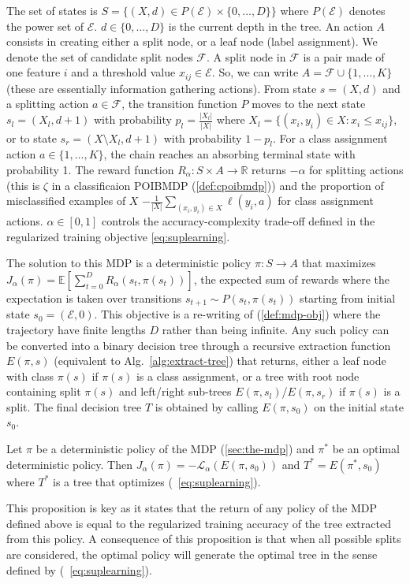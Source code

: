 The set of states is $S = \{ (X, d) \in P(\mathcal{E}) \times \{0, \ldots, D\} \}$ where $P(\mathcal{E})$ denotes the power set of $\mathcal{E}$. $d \in \{0,\ldots,D\}$ is the current depth in the tree.
An action $A$ consists in creating either a split node, or a leaf node (label assignment). We denote the set of candidate split nodes $ {\mathcal F} $. A split node in $\mathcal F$ is a pair made of one feature $i$ and a threshold value $x_{ij}\in \mathcal{E}$.
So, we can write $A = {\mathcal{F} \cup \{ 1, \ldots, K \}}$ (these are essentially information gathering actions).
From state $s=(X,d)$ and a splitting action $a \in {\mathcal F}$, the transition function $P$ moves to the next state $s_l = (X_l, d+1)$ with probability $p_l = \frac{|X_l|}{|X|}$ where $X_l = \{(x_i, y_i) \in X: x_i \leq x_{ij}\}$, or to state $s_r = (X \setminus X_l, d+1)$ with probability $1-p_l$. For a class assignment action $a \in \{1,\ldots,K\}$, the chain reaches an absorbing terminal state with probability 1. 
The reward function $R_{\alpha}: S \times A \rightarrow \mathbb{R}$ returns $-\alpha$ for splitting actions (this is $\zeta$ in a classificaion POIBMDP (\ref{def:cpoibmdp})) and the proportion of misclassified examples of $X$ $-\frac{1}{|X|}\sum_{(x_i,y_i) \in X} \ell(y_i, a)$ for class assignment actions. $\alpha \in [0,1]$ controls the accuracy-complexity trade-off defined in the regularized training objective \ref{eq:suplearning}. 

The solution to this MDP is a deterministic policy $\pi: S \rightarrow A$ that maximizes {$J_{\alpha}(\pi) ={\mathbb{E}}\left[\sum_{t = 0}^D R_{\alpha}(s_t, \pi(s_t))\right]$\label{def:finite-mdp-obj}}, the expected sum of rewards where the expectation is taken over transitions $s_{t+1}\sim P(s_t, \pi(s_t))$ starting from initial state $s_0 = (\mathcal{E}, 0)$.
This objective is a re-writing of (\ref{def:mdp-obj}) where the trajectory have finite lengths $D$ rather than being infinite.
Any such policy can be converted into a binary decision tree through a recursive extraction function $E(\pi, s)$ (equivalent to Alg.~\ref{alg:extract-tree}) that returns, either a leaf node with class $\pi(s)$ if $\pi(s)$ is a class assignment, or a tree with root node containing split $\pi(s)$ and left/right sub-trees $E(\pi, s_l)$/$E(\pi, s_r)$ if $\pi(s)$ is a split. The final decision tree $T$ is obtained by calling $E(\pi, s_0)$ on the initial state $s_0$. 

\begin{proposition}\label{prop:equiv}
Let $\pi$ be a deterministic policy of the MDP (\ref{sec:the-mdp}) and $\pi^*$ be an optimal deterministic policy. 
Then $J_\alpha(\pi) = -{\mathcal L}_\alpha(E(\pi, s_0))$ and $T^* = E(\pi^*, s_0)$ where $T^*$ is a tree that optimizes (~\ref{eq:suplearning}).
\end{proposition}
This proposition is key as it states that the return of any policy of the MDP defined above is equal to the regularized training accuracy of the tree extracted from this policy.
A consequence of this proposition is that when all possible splits are considered, the optimal policy will generate the optimal tree in the sense defined by (~\eqref{eq:suplearning}).

